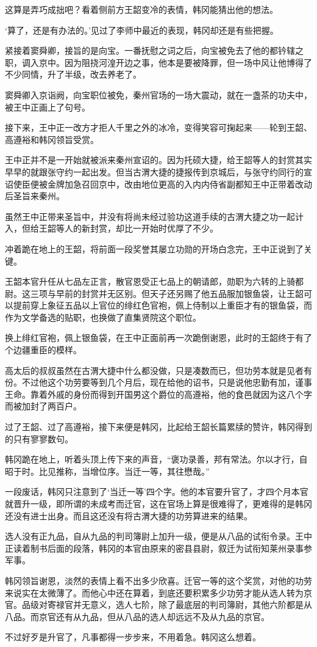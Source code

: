 这算是弄巧成拙吧？看着侧前方王韶变冷的表情，韩冈能猜出他的想法。

‘算了，还是有办法的。’见过了李师中最近的表现，韩冈却还是有些把握。

紧接着窦舜卿，接旨的是向宝。一番抚慰之词之后，向宝被免去了他的都钤辖之职，调入京中。因为阻挠河湟开边之事，他本是要被降罪，但一场中风让他博得了不少同情，升了半级，改去养老了。

窦舜卿入京诣阙，向宝职位被免，秦州官场的一场大震动，就在一盏茶的功夫中，被王中正画上了句号。

接下来，王中正一改方才拒人千里之外的冰冷，变得笑容可掬起来——轮到王韶、高遵裕和韩冈领旨受赏。

王中正并不是一开始就被派来秦州宣诏的。因为托硕大捷，给王韶等人的封赏其实早早的就跟张守约一起出发。但当古渭大捷的捷报传到京城后，与张守约同行的宣诏使臣便被金牌加急召回京中，改由地位更高的入内内侍省副都知王中正带着改动后圣旨来秦州。

虽然王中正带来圣旨中，并没有将尚未经过验功这道手续的古渭大捷之功一起计入，但给王韶等人的新封赏，却比一开始时优厚了不少。

冲着跪在地上的王韶，将前面一段奖誉其屡立功勋的开场白念完，王中正说到了关键。

王韶本官升任从七品左正言，散官恩受正七品上的朝请郎，勋职为六转的上骑都尉。这三项与早前的封赏并无区别。但天子还另赐了他五品服加银鱼袋，让王韶可以提前穿上象征五品以上官位的绯红色官袍，佩上侍制以上重臣才有的银鱼袋，而作为文学备选的贴职，也换做了直集贤院这个职位。

换上绯红官袍，佩上银鱼袋，在王中正面前再一次跪倒谢恩，此时的王韶终于有了个边疆重臣的模样。

高太后的叔叔虽然在古渭大捷中什么都没做，只是凑数而已，但功劳本就是见者有份。不过他这个功劳要等到几个月后，现在给他的诏书，只是说他忠勤有加，谨事王命。靠着外戚的身份而得到开国男这个爵位的高遵裕，他的食邑就因为这八个字而被加封了两百户。

过了王韶、过了高遵裕，接下来便是韩冈，比起给王韶长篇累牍的赞许，韩冈得到的只有寥寥数句。

韩冈跪在地上，听着头顶上传下来的声音，“褒功录善，邦有常法。尔以才行，自昭于时。比见推称，当增位序。当迁一等，其往懋哉。”

一段废话，韩冈只注意到了‘当迁一等’四个字。他的本官要升官了，才四个月本官就晋升一级，即所谓的未成考而迁官，这在官场上算是很难得了，更难得的是韩冈还没有进士出身。而且这还没有将古渭大捷的功劳算进来的结果。

选人没有正九品，自从九品的判司簿尉上加升一级，便是从八品的试衔令录。王中正读着制书后面的段落，韩冈的本官由原来的密县县尉，叙迁为试衔知莱州录事参军事。

韩冈领旨谢恩，淡然的表情上看不出多少欣喜。迁官一等的这个奖赏，对他的功劳来说实在太微薄了。而他心中还在算着，到底还要积累多少功劳才能从选人转为京官。品级对寄禄官并无意义，选人七阶，除了最底层的判司簿尉，其他六阶都是从八品。而京官还有从九品，但从八品的选人却远远不及从九品的京官。

不过好歹是升官了，凡事都得一步步来，不用着急。韩冈这么想着。

